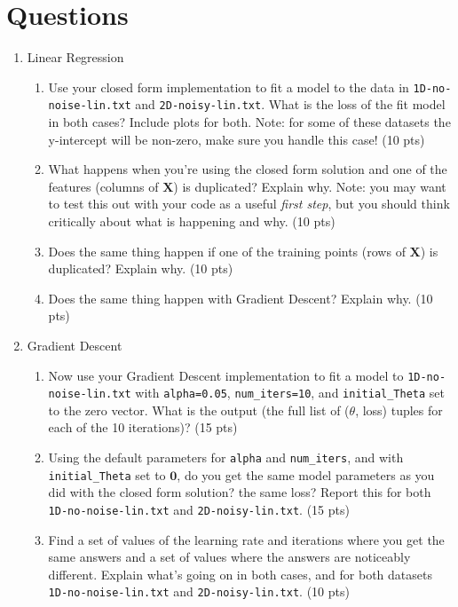\documentclass{article} %
\begin{document}
\section*{Questions}
\begin{enumerate}
	\item Linear Regression
	\begin{enumerate}
		\item Use your closed form implementation to fit a model to the data in \texttt{1D-no-noise-lin.txt} and 
		\texttt{2D-noisy-lin.txt}. What is the loss of the fit model in both cases? Include plots for both. Note: for some of 
		these datasets the y-intercept will be non-zero, make sure you handle this case! (10 pts)
		
		\item What happens when you're using the closed form solution and one of the features (columns of \(\textbf{X}\)) is 
		duplicated? Explain why. Note: you may want to test this out with your code as a useful \emph{first step}, but you should think critically about what is happening and why. (10 pts)
		
		\item Does the same thing happen if one of the training points (rows of \(\textbf{X}\)) is duplicated? Explain why. (10 pts)
		
		\item Does the same thing happen with Gradient Descent? Explain why. (10 pts)
		
	\end{enumerate}
	\item Gradient Descent
	\begin{enumerate}
		\item Now use your Gradient Descent implementation to fit a model to \texttt{1D-no-noise-lin.txt} with 
		\texttt{alpha=0.05}, \texttt{num\_iters=10}, and \texttt{initial\_Theta} set to the zero vector. What is the output 
		(the full list of (\(\theta\), loss) tuples for each of the 10 iterations)? (15 pts)
		
		\item Using the default parameters for \texttt{alpha} and \texttt{num\_iters}, and with \texttt{initial\_Theta} set to 
		\(\mathbf{0}\), do you get the same model parameters as you did with the closed form solution? the same loss? Report this for both \texttt{1D-no-noise-lin.txt} and \texttt{2D-noisy-lin.txt}. (15 pts)
		
		\item Find a set of values of the learning rate and iterations where you get the same answers and a set of values 
		where the answers are noticeably different. Explain what's going on in both cases, and for both datasets \texttt{1D-no-noise-lin.txt} and \texttt{2D-noisy-lin.txt}. (10 pts)
		

\end{enumerate}
\end{enumerate}
\end{document}
